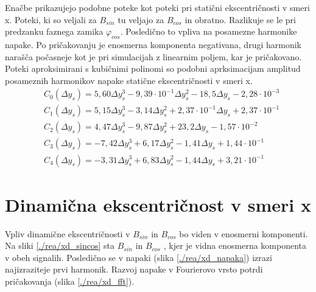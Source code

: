Enačbe prikazujejo podobne poteke kot poteki pri statični ekscentričnosti v smeri x. Poteki, ki so veljali za $B_{sin}$ tu veljajo za $B_{cos}$ in obratno. Razlikuje se le pri predzanku faznega zamika $\varphi_{cos}$. 
Posledično to vpliva na posamezne harmonike napake. Po pričakovanju je enosmerna komponenta negativana, drugi harmonik narašča počasneje kot je pri simulacijah z linearnim poljem, kar je pričakovano. Poteki aproksimirani s kubičnimi polinomi so podobni aprksimacijam amplitud posameznih harmonikov napake statične ekscentričnosti v smeri x.
\begin{eqnarray}
&C_0( \Delta y_s) =5,60\Delta y_s^{3}-9,39\cdot 10^{-1}\Delta y_s^{2}-18,5\Delta y_s-2,28\cdot 10^{-3} \\
&C_1 ( \Delta y_s)=5,15\Delta y_s^{3}-3,14\Delta y_s^{2}+2,37\cdot 10^{-1}\Delta y_s+2,37\cdot 10^{-1} \\        
&C_2 ( \Delta y_s)=4,47\Delta y_s^{3}-9,87\Delta y_s^{2}+23,2\Delta y_s-1,57\cdot 10^{-2} \\             
&C_3( \Delta y_s) =-7,42\Delta y_s^{3}+6,17\Delta y_s^{2}-1,41\Delta y_s+1,44\cdot 10^{-1} \\                    
&C_4 ( \Delta y_s)=-3,31\Delta y_s^{3}+6,83\Delta y_s^{2}-1,44\Delta y_s+3,21\cdot 10^{-1}         
\end{eqnarray}
\section{Dinamična ekscentričnost v smeri x}
Vpliv dinamične ekscentričnosti v $B_{sin}$ in $B_{cos}$ bo viden v enosmerni komponenti. Na sliki  \ref{./rea/xd_sincos} sta $B_{sin}$ in $B_{cos}$ , kjer je vidna enosmerna komponenta v obeh signalih. Posledično se v napaki (slika \ref{./rea/xd_napaka})  izrazi  najizraziteje prvi harmonik. Razvoj napake v Fourierovo vrsto potrdi pričakovanja (slika \ref{./rea/xd_fft}).  
\newpage
